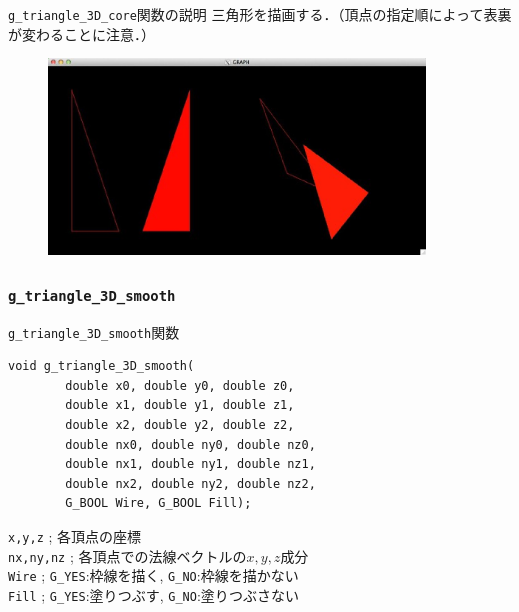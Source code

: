 \documentclass[platex,a4paper,12pt]{jsarticle}%
\begin{document}
\begin{itembox}[l]{\texttt{g\_triangle\_3D\_core}関数の説明}
三角形を描画する．（頂点の指定順によって表裏が変わることに注意．）
\end{itembox}

\begin{figure}[htb]
	\includegraphics[width=100mm]{./Figures/eps/Canvas_g_triangle.eps}
\end{figure}


\clearpage
\subsubsection{\texttt{g\_triangle\_3D\_smooth}}

\begin{itembox}[l]{\texttt{g\_triangle\_3D\_smooth}関数}
\begin{verbatim}
void g_triangle_3D_smooth(
        double x0, double y0, double z0,
        double x1, double y1, double z1,
        double x2, double y2, double z2,
        double nx0, double ny0, double nz0,
        double nx1, double ny1, double nz1,
        double nx2, double ny2, double nz2,
        G_BOOL Wire, G_BOOL Fill);  
\end{verbatim}
\verb|x,y,z| ; 各頂点の座標\\
\verb|nx,ny,nz| ; 各頂点での法線ベクトルの$x,y,z$成分\\
\verb|Wire| ; \verb|G_YES|:枠線を描く, \verb|G_NO|:枠線を描かない \\
\verb|Fill| ; \verb|G_YES|:塗りつぶす, \verb|G_NO|:塗りつぶさない 
\end{itembox}
\end{document}
